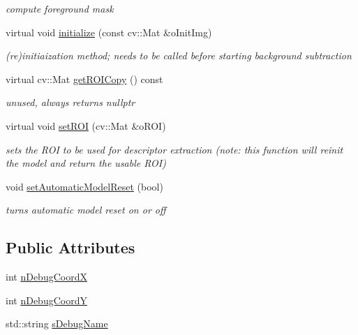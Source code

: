 \begin{DoxyCompactItemize}
\begin{DoxyCompactList}\small\item\em compute foreground mask \end{DoxyCompactList}\item 
virtual void \mbox{\hyperlink{class_background_subtractor_l_b_s_p_ac6b854f94414497b143375d4a0ae8b6f}{initialize}} (const cv\+::\+Mat \&o\+Init\+Img)
\begin{DoxyCompactList}\small\item\em (re)initiaization method; needs to be called before starting background subtraction \end{DoxyCompactList}\item 
virtual cv\+::\+Mat \mbox{\hyperlink{class_background_subtractor_l_b_s_p_a9843f87f8adcd0e85274303f9210b883}{get\+R\+O\+I\+Copy}} () const
\begin{DoxyCompactList}\small\item\em unused, always returns nullptr \end{DoxyCompactList}\item 
virtual void \mbox{\hyperlink{class_background_subtractor_l_b_s_p_a34dc38d3d925d46d289c750786f232dc}{set\+R\+OI}} (cv\+::\+Mat \&o\+R\+OI)
\begin{DoxyCompactList}\small\item\em sets the R\+OI to be used for descriptor extraction (note\+: this function will reinit the model and return the usable R\+OI) \end{DoxyCompactList}\item 
void \mbox{\hyperlink{class_background_subtractor_l_b_s_p_a31b8474f8b4ffa6ef08ec682cfcef9b0}{set\+Automatic\+Model\+Reset}} (bool)
\begin{DoxyCompactList}\small\item\em turns automatic model reset on or off \end{DoxyCompactList}\end{DoxyCompactItemize}
\subsection*{Public Attributes}
\begin{DoxyCompactItemize}
\item 
int \mbox{\hyperlink{class_background_subtractor_l_b_s_p_a49771cd7b2c8354cde3da6e593d3febe}{n\+Debug\+CoordX}}
\item 
int \mbox{\hyperlink{class_background_subtractor_l_b_s_p_a8e1451fd90eb4459aa84ea5e7133268a}{n\+Debug\+CoordY}}
\item 
std\+::string \mbox{\hyperlink{class_background_subtractor_l_b_s_p_ada55b4a5eec8c82d0e05b0f9f1600ecb}{s\+Debug\+Name}}
\end{DoxyCompactItemize}

